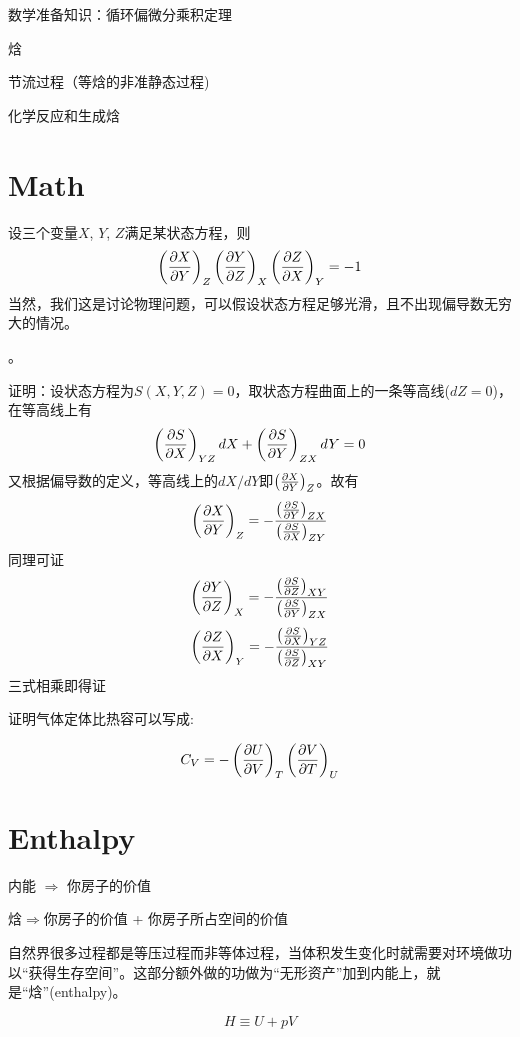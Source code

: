 \documentclass[CJK]{beamer}
\begin{document}
\begin{frame}
\bch
\bitem
\item{数学准备知识：循环偏微分乘积定理}
\item{焓}
\item{节流过程（等焓的非准静态过程)}
\item{化学反应和生成焓}
\eitem
\ech
\end{frame}

\section{Math}

\begin{frame}
\bch
设三个变量$X$, $Y$, $Z$满足某状态方程，则
{\blue 
$$\pfrac XYZ  \pfrac YZX \pfrac ZXY = -1$$
}
当然，我们这是讨论物理问题，可以假设状态方程足够光滑，且不出现偏导数无穷大的情况。

\skipline

。
\ech
\end{frame}

\begin{frame}
\bch
{\scriptsize
证明：设状态方程为$S(X, Y, Z) = 0$，取状态方程曲面上的一条等高线($dZ = 0$)，在等高线上有
$$\pfrac SX{YZ} dX + \pfrac SY{ZX} dY = 0$$
又根据偏导数的定义，等高线上的$dX/dY$即$\pfrac XYZ$。故有
$$\pfrac XYZ = -\frac{\pfrac SY{ZX}}{\pfrac SX{ZY}}$$
同理可证
$$\pfrac YZX = -\frac{\pfrac SZ{XY}}{\pfrac SY{ZX}}$$
$$\pfrac ZXY = -\frac{\pfrac SX{YZ}}{\pfrac SZ{XY}}$$
三式相乘即得证
}
\ech
\end{frame}

\begin{frame}
\bch
{}

证明气体定体比热容可以写成:

$$
C_V =  - \pfrac UVT \pfrac VTU 
$$

\ech
\end{frame}


\section{Enthalpy}

\begin{frame}
\bch

内能 $\Rightarrow$ 你房子的价值

焓$\Rightarrow$你房子的价值 + 你房子所占空间的价值

\skipline

自然界很多过程都是等压过程而非等体过程，当体积发生变化时就需要对环境做功以“获得生存空间”。这部分额外做的功做为“无形资产”加到内能上，就是“焓”(enthalpy)。

$$ H \equiv U + pV$$


\ech
\end{frame}
\end{document}
